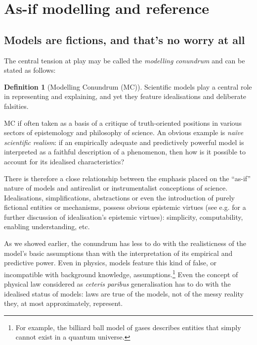 \documentclass[a4paper,11pt]{article}
\theoremstyle{definition}
\newtheorem{definition}{Definition}
\begin{document}
\section{As-if modelling and reference}
\label{sec:asifVerifJust}

\subsection{Models are fictions, and that's no worry at all}

The central tension at play may be called the \textit{modelling conundrum} and can be stated as follows:

\begin{definition}[Modelling Conundrum (MC)]
    Scientific models play a central role in representing and explaining, and yet they feature idealisations and deliberate falsities.
\end{definition}

MC if often taken as a basis of a critique of truth-oriented positions in various sectors of epistemology and philosophy of science. An obvious example is \textit{naïve scientific realism}: if an empirically adequate and predictively powerful model is interpreted as a faithful description of a phenomenon, then how is it possible to account for its idealised characteristics?

There is therefore a close relationship between the emphasis placed on the ``as-if'' nature of models and antirealist or instrumentalist conceptions of science. Idealisations, simplifications, abstractions or even the introduction of purely fictional entities or mechanisms, possess obvious epistemic virtues (see e.g. \citep{Sullivan2019, Lawler2019, Nawar2019, Pincock2021} for a further discussion of idealisation's epistemic virtues): simplicity, computability, enabling understanding, etc. 

As we showed earlier, the conundrum has less to do with the realisticness of the model's basic assumptions than with the interpretation of its empirical and predictive power. Even in physics, models feature this kind of false, or incompatible with background knowledge, assumptions.\footnote{For example, the billiard ball model of gases describes entities that simply cannot exist in a quantum universe.} Even the concept of physical law considered as \textit{ceteris paribus} generalisation \citep{Cartwright1983} has to do with the idealised status of models: laws are true of the models, not of the messy reality they, at most approximately, represent.
\end{document}
